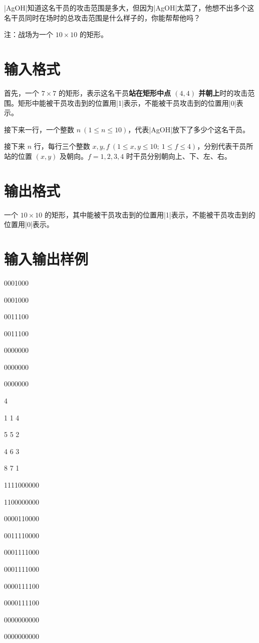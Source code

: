 \documentclass{ctpro}
\begin{document}
|AgOH|知道这名干员的攻击范围是多大，但因为|AgOH|太菜了，他想不出多个这名干员同时在场时的总攻击范围是什么样子的，你能帮帮他吗？

注：战场为一个 $10 \times 10$ 的矩形。

\section*{输入格式}
首先，一个 $7 \times 7$ 的矩形，表示这名干员\textbf{站在矩形中点 $(4,4)$ 并朝上}时的攻击范围。矩形中能被干员攻击到的位置用|1|表示，不能被干员攻击到的位置用|0|表示。

接下来一行，一个整数 $n~(1 \leq n \leq 10)$，代表|AgOH|放下了多少个这名干员。

接下来 $n$ 行，每行三个整数 $x,y,f~(1 \leq x,y \leq 10;~1 \leq f \leq 4)$，分别代表干员所站的位置 $(x,y)$ 及朝向。$f=1,2,3,4$ 时干员分别朝向上、下、左、右。

\section*{输出格式}
一个 $10 \times 10$ 的矩形，其中能被干员攻击到的位置用|1|表示，不能被干员攻击到的位置用|0|表示。

\section*{输入输出样例}
\testcasetab
{
	0001000\par
	0001000\par
	0011100\par
	0011100\par
	0000000\par
	0000000\par
	0000000\par
	4\par
	1 1 4\par
	5 5 2\par
	4 6 3\par
	8 7 1
}
{
	1111000000\par
	1100000000\par
	0000110000\par
	0011110000\par
	0001111000\par
	0001111000\par
	0000111100\par
	0000111100\par
	0000000000\par
	0000000000
}
\end{document}
